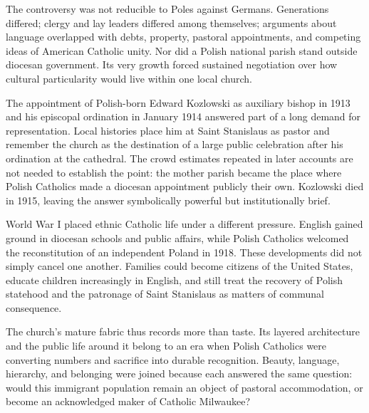 The controversy was not reducible to Poles against Germans. Generations differed; clergy and lay leaders differed among themselves; arguments about language overlapped with debts, property, pastoral appointments, and competing ideas of American Catholic unity. Nor did a Polish national parish stand outside diocesan government. Its very growth forced sustained negotiation over how cultural particularity would live within one local church.

The appointment of Polish-born Edward Kozlowski as auxiliary bishop in 1913 and his episcopal ordination in January 1914 answered part of a long demand for representation. Local histories place him at Saint Stanislaus as pastor and remember the church as the destination of a large public celebration after his ordination at the cathedral. The crowd estimates repeated in later accounts are not needed to establish the point: the mother parish became the place where Polish Catholics made a diocesan appointment publicly their own. Kozlowski died in 1915, leaving the answer symbolically powerful but institutionally brief.

World War I placed ethnic Catholic life under a different pressure. English gained ground in diocesan schools and public affairs, while Polish Catholics welcomed the reconstitution of an independent Poland in 1918. These developments did not simply cancel one another. Families could become citizens of the United States, educate children increasingly in English, and still treat the recovery of Polish statehood and the patronage of Saint Stanislaus as matters of communal consequence.

The church's mature fabric thus records more than taste. Its layered architecture and the public life around it belong to an era when Polish Catholics were converting numbers and sacrifice into durable recognition. Beauty, language, hierarchy, and belonging were joined because each answered the same question: would this immigrant population remain an object of pastoral accommodation, or become an acknowledged maker of Catholic Milwaukee?

